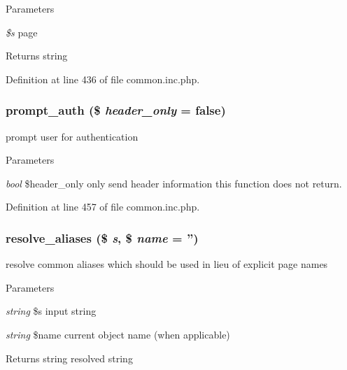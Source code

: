 \begin{DoxyParams}{Parameters}
\item[{\em \$s}]page \end{DoxyParams}
\begin{DoxyReturn}{Returns}
string 
\end{DoxyReturn}


Definition at line 436 of file common.inc.php.

\hypertarget{common_8inc_8php_a80c23c9d8ac02159151d6368506b1b54}{
\subsubsection[{prompt\_\-auth}]{\setlength{\rightskip}{0pt plus 5cm}prompt\_\-auth (\$ {\em header\_\-only} = {\ttfamily false})}}
\label{common_8inc_8php_a80c23c9d8ac02159151d6368506b1b54}
prompt user for authentication


\begin{DoxyParams}{Parameters}
\item[{\em bool}]\$header\_\-only only send header information this function does not return. \end{DoxyParams}


Definition at line 457 of file common.inc.php.

\hypertarget{common_8inc_8php_a78992fdfae6cd9d7d4e8053d004d1709}{
\subsubsection[{resolve\_\-aliases}]{\setlength{\rightskip}{0pt plus 5cm}resolve\_\-aliases (\$ {\em s}, \/  \$ {\em name} = {\ttfamily ''})}}
\label{common_8inc_8php_a78992fdfae6cd9d7d4e8053d004d1709}
resolve common aliases which should be used in lieu of explicit page names


\begin{DoxyParams}{Parameters}
\item[{\em string}]\$s input string \item[{\em string}]\$name current object name (when applicable) \end{DoxyParams}
\begin{DoxyReturn}{Returns}
string resolved string 
\end{DoxyReturn}


